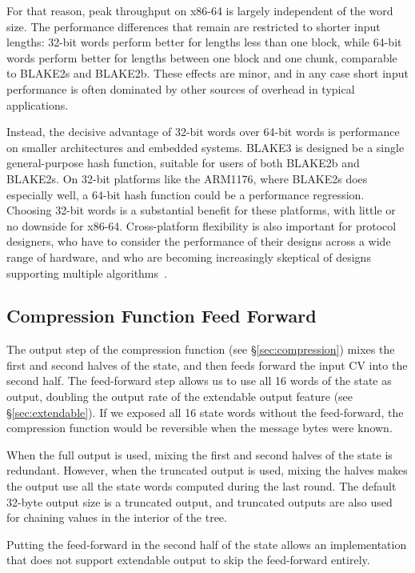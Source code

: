 \documentclass[11pt,notitlepage,a4paper]{article}
\begin{document}
For that reason, peak throughput on x86-64 is largely independent of the word
size. The performance differences that remain are restricted to shorter input
lengths: 32-bit words perform better for lengths less than one block, while
64-bit words perform better for lengths between one block and one chunk,
comparable to BLAKE2s and BLAKE2b. These effects are minor, and in any case
short input performance is often dominated by other sources of overhead in
typical applications.

Instead, the decisive advantage of 32-bit words over 64-bit words is
performance on smaller architectures and embedded systems. BLAKE3 is designed
be a single general-purpose hash function, suitable for users of both BLAKE2b
and BLAKE2s. On 32-bit platforms like the ARM1176, where BLAKE2s does
especially well, a 64-bit hash function could be a performance regression.
Choosing 32-bit words is a substantial benefit for these platforms, with little
or no downside for x86-64. Cross-platform flexibility is also important for
protocol designers, who have to consider the performance of their designs
across a wide range of hardware, and who are becoming increasingly skeptical of
designs supporting multiple algorithms~\cite{WG}.

\subsection{Compression Function Feed Forward}\label{sec:feedforward}

The output step of the compression function (see \S\ref{sec:compression}) mixes
the first and second halves of the state, and then feeds forward the input CV
into the second half. The feed-forward step allows us to use all 16 words of
the state as output, doubling the output rate of the extendable output feature
(see \S\ref{sec:extendable}). If we exposed all 16 state words without the
feed-forward, the compression function would be reversible when the message
bytes were known.

When the full output is used, mixing the first and second halves of the state
is redundant. However, when the truncated output is used, mixing the halves
makes the output use all the state words computed during the last round. The
default 32-byte output size is a truncated output, and truncated outputs are
also used for chaining values in the interior of the tree.

Putting the feed-forward in the second half of the state allows an
implementation that does not support extendable output to skip the feed-forward
entirely.
\end{document}
